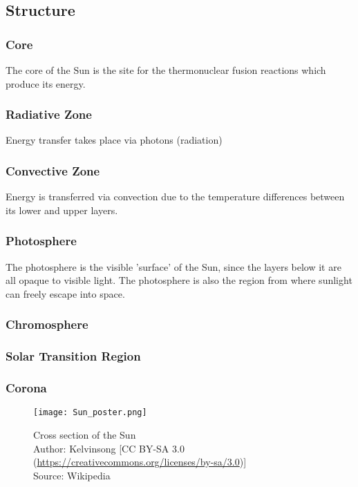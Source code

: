 \subsection{Structure}



\subsubsection*{Core}

The core of the Sun is the site for the thermonuclear fusion reactions which produce its energy. 

\subsubsection*{Radiative Zone}

Energy transfer takes place via photons (radiation)

\subsubsection*{Convective Zone}

Energy is transferred via convection due to the temperature differences between its lower and upper layers.

\subsubsection*{Photosphere}

The photosphere is the visible 'surface' of the Sun, since the layers below it are all opaque to visible light.
The photosphere is also the region from where sunlight can freely escape into space.

\subsubsection*{Chromosphere}

\subsubsection*{Solar Transition Region}

\subsubsection*{Corona}

\begin{figure}
    \noindent\texttt{[image: Sun\_poster.png]}
    \caption{\small Cross section of the Sun \\ Author: Kelvinsong [CC BY-SA 3.0 (\url{https://creativecommons.org/licenses/by-sa/3.0})] \\ Source: Wikipedia}
    \label{fig:SunLayers}
\end{figure}

